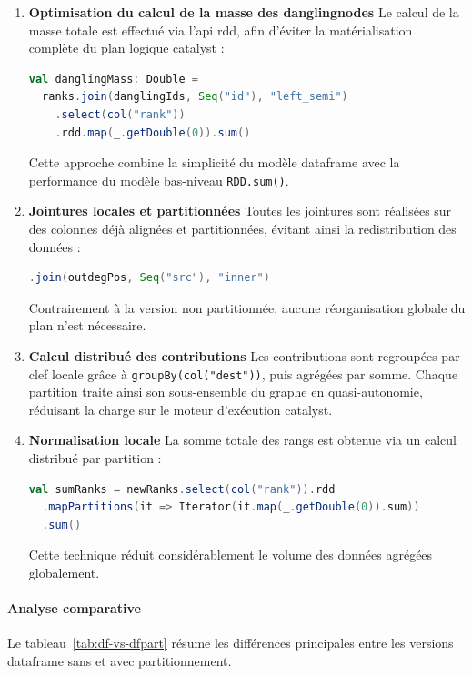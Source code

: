\documentclass[conference]{IEEEtran}
\begin{document}
\begin{enumerate}
  \item \textbf{Optimisation du calcul de la masse des \glspl{danglingnode}}  
  Le calcul de la masse totale est effectué via l'\gls{api} \gls{rdd}, afin d'éviter la matérialisation complète du plan logique \gls{catalyst} :
  \begin{lstlisting}[language=Scala]
val danglingMass: Double =
  ranks.join(danglingIds, Seq("id"), "left_semi")
    .select(col("rank"))
    .rdd.map(_.getDouble(0)).sum()
  \end{lstlisting}
  Cette approche combine la simplicité du modèle \gls{dataframe} avec la performance du modèle bas-niveau \texttt{RDD.sum()}.

  \item \textbf{Jointures locales et partitionnées}  
  Toutes les jointures sont réalisées sur des colonnes déjà alignées et partitionnées, évitant ainsi la redistribution des données :
  \begin{lstlisting}[language=Scala]
.join(outdegPos, Seq("src"), "inner")
  \end{lstlisting}
  Contrairement à la version non partitionnée, aucune réorganisation globale du plan n'est nécessaire.

  \item \textbf{Calcul distribué des contributions}  
  Les contributions sont regroupées par clef locale grâce à \texttt{groupBy(col("dest"))}, puis agrégées par somme.  
  Chaque partition traite ainsi son sous-ensemble du graphe en quasi-autonomie, réduisant la charge sur le moteur d'exécution \gls{catalyst}.

  \item \textbf{Normalisation locale}  
  La somme totale des rangs est obtenue via un calcul distribué par partition :
  \begin{lstlisting}[language=Scala]
val sumRanks = newRanks.select(col("rank")).rdd
  .mapPartitions(it => Iterator(it.map(_.getDouble(0)).sum))
  .sum()
  \end{lstlisting}
  Cette technique réduit considérablement le volume des données agrégées globalement.
\end{enumerate}

\paragraph{Analyse comparative}

Le tableau~\ref{tab:df-vs-dfpart} résume les différences principales entre les versions \gls{dataframe} sans et avec partitionnement.
\end{document}
